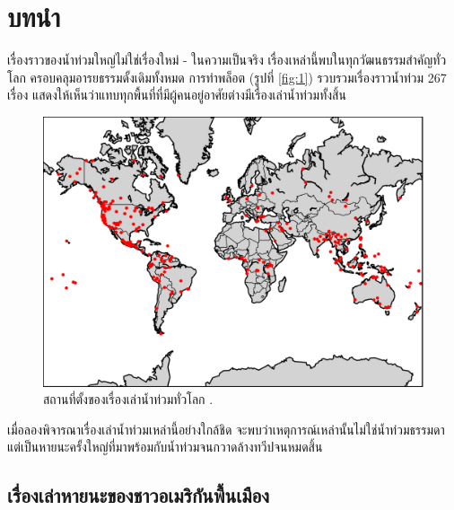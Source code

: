 \documentclass[10pt,twocolumn,letterpaper]{article}
\begin{document}
\section{บทนำ}

เรื่องราวของน้ำท่วมใหญ่ไม่ใช่เรื่องใหม่ - ในความเป็นจริง เรื่องเหล่านี้พบในทุกวัฒนธรรมสำคัญทั่วโลก ครอบคลุมอารยธรรมดั้งเดิมทั้งหมด การทำพล็อต (รูปที่ \ref{fig:1}) รวบรวมเรื่องราวน้ำท่วม 267 เรื่อง \cite{3} แสดงให้เห็นว่าแทบทุกพื้นที่ที่มีผู้คนอยู่อาศัยต่างมีเรื่องเล่าน้ำท่วมทั้งสิ้น

\begin{figure}[h]
\begin{center}
   \includegraphics[width=1\linewidth]{b.png}
\end{center}
   \caption{สถานที่ตั้งของเรื่องเล่าน้ำท่วมทั่วโลก \cite{3}.}
\label{fig:1}
\label{fig:onecol}
\end{figure}

เมื่อลองพิจารณาเรื่องเล่าน้ำท่วมเหล่านี้อย่างใกล้ชิด จะพบว่าเหตุการณ์เหล่านั้นไม่ใช่น้ำท่วมธรรมดา แต่เป็นหายนะครั้งใหญ่ที่มาพร้อมกับน้ำท่วมจนกวาดล้างทวีปจนหมดสิ้น

\subsection{เรื่องเล่าหายนะของชาวอเมริกันพื้นเมือง}
\end{document}
